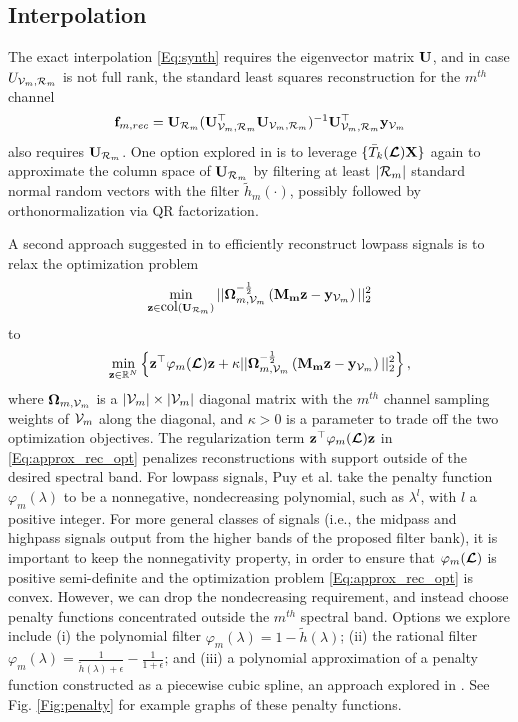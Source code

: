 \documentclass[journal, 10pt]{IEEEtran}
\begin{document}
\subsection{Interpolation}
The exact interpolation \eqref{Eq:synth} requires the eigenvector matrix ${\bf U}$, and in case $U_{\V_m,{\cal R}_m}$ is not full rank, the standard least squares reconstruction for the $m^{th}$ channel
\begin{align}
{\bf f}_{m,{rec}}=\mathbf{U}_{{\cal R}_m}(\mathbf{U}_{\V_m,{\cal R}_m}^{\top}\mathbf{U}_{\V_m,{\cal R}_m})^{-1}\mathbf{U}_{\V_m,{\cal R}_m}^{\top}{\bf y}_{\V_m}
\end{align}
also requires ${\bf U}_{{\cal R}_m}$. One option explored in \cite{halko,paratte} is to leverage $\{\bar{T}_k(\boldsymbol{\mathcal{L}}){\bf X}\}$ again to approximate the column space of ${\bf U}_{{\cal R}_m}$ by filtering at least $|{\cal R}_m|$ standard normal random vectors with the filter $\tilde{h}_m(\cdot)$, possibly followed by orthonormalization via QR factorization.


A second approach suggested in \cite{PuyTGV15} to efficiently reconstruct lowpass signals is to relax the optimization problem
\begin{align*}
\min_{{\bf z} \in \hbox{col}({\bf U}_{{\cal R}_m})} ||{\boldsymbol \Omega}_{m,\V_m}^{-\frac{1}{2}}\left({\bf M_m z}-{{\bf y}_{\V_m}} \right) ||_2^2
\end{align*} 
to 
\begin{align}\label{Eq:approx_rec_opt}
\min_{{\bf z} \in \R^N} \left\{{\bf z}^{\top}\varphi_m(\L){\bf z} + \kappa ||{\boldsymbol \Omega}_{m,\V_m}^{-\frac{1}{2}}\left({\bf M_m z}-{{\bf y}_{\V_m}} \right) ||_2^2\right\},
\end{align} 
where ${\boldsymbol \Omega}_{m,{\mathcal{V}}_m}$ is a $|{\mathcal{V}}_m| \times |{\mathcal{V}}_m|$  diagonal matrix with the $m^{th}$ channel sampling weights of ${\mathcal{V}}_m$ along the diagonal, and $\kappa>0$ is a parameter to trade off the two optimization objectives. The regularization term ${\bf z}^{\top}\varphi_m(\boldsymbol{\mathcal{L}}){\bf z}$ in \eqref{Eq:approx_rec_opt} penalizes reconstructions with support outside of the desired spectral band. For lowpass signals, Puy et al. \cite{PuyTGV15} take the penalty function $\varphi_m(\lambda)$ to be a nonnegative, nondecreasing polynomial, such as $\lambda^l$, with $l$ a positive integer. For more general classes of signals (i.e., the midpass and highpass signals output from the higher bands of the proposed filter bank), it is important to keep the nonnegativity property, in order to ensure that $\varphi_m(\boldsymbol{\mathcal{L}})$ is positive semi-definite and the optimization problem \eqref{Eq:approx_rec_opt} is convex. However, we can drop the nondecreasing requirement, and instead choose penalty functions concentrated outside the $m^{th}$ spectral band. Options we explore include (i) the polynomial filter $\varphi_m(\lambda)=1-\tilde{h}(\lambda)$; (ii) the rational filter $\varphi_m(\lambda)=\frac{1}{\tilde{h}(\lambda)+\epsilon}-\frac{1}{1+\epsilon}$; 
and (iii) a polynomial approximation of a penalty function constructed as a piecewise cubic spline, an approach explored in \cite{chen_saad}. See Fig. \ref{Fig:penalty} for example graphs of these penalty functions.
\end{document}
